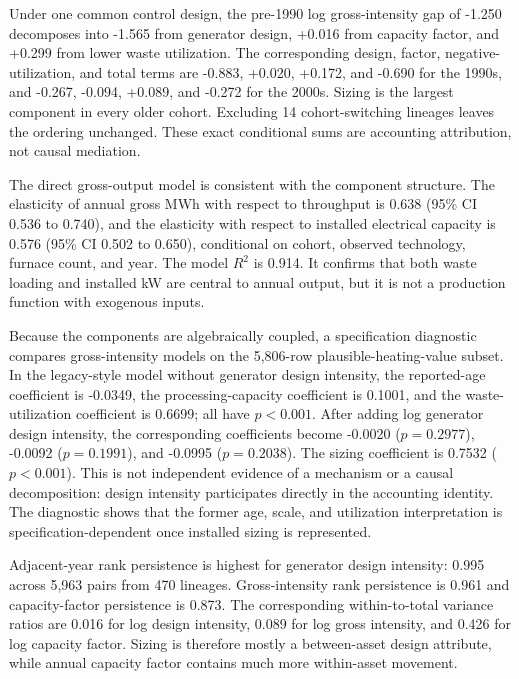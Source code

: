 \documentclass[11pt,letterpaper]{article}
\begin{document}
Under one common control design, the pre-1990 log gross-intensity gap of -1.250
decomposes into -1.565 from generator design, +0.016 from capacity factor, and
+0.299 from lower waste utilization. The corresponding design, factor,
negative-utilization, and total terms are -0.883, +0.020, +0.172, and -0.690
for the 1990s, and -0.267, -0.094, +0.089, and -0.272 for the 2000s. Sizing is
the largest component in every older cohort. Excluding 14 cohort-switching
lineages leaves the ordering unchanged. These exact conditional sums are
accounting attribution, not causal mediation.

The direct gross-output model is consistent with the component structure. The
elasticity of annual gross MWh with respect to throughput is 0.638 (95\% CI
0.536 to 0.740), and the elasticity with respect to installed electrical
capacity is 0.576 (95\% CI 0.502 to 0.650), conditional on cohort, observed
technology, furnace count, and year. The model $R^2$ is 0.914. It confirms that
both waste loading and installed kW are central to annual output, but it is not
a production function with exogenous inputs.

Because the components are algebraically coupled, a specification diagnostic
compares gross-intensity models on the 5,806-row plausible-heating-value subset.
In the legacy-style model without
generator design intensity, the reported-age coefficient is -0.0349, the
processing-capacity coefficient is 0.1001, and the waste-utilization coefficient
is 0.6699; all have $p<0.001$. After adding log generator design intensity, the
corresponding coefficients become -0.0020 ($p=0.2977$), -0.0092
($p=0.1991$), and -0.0995 ($p=0.2038$). The sizing coefficient is 0.7532
($p<0.001$). This is not independent evidence of a mechanism or a causal
decomposition: design intensity participates directly in the accounting
identity. The diagnostic shows that the former age, scale, and utilization
interpretation is specification-dependent once installed sizing is represented.

Adjacent-year rank persistence is highest for generator design intensity:
0.995 across 5,963 pairs from 470 lineages. Gross-intensity rank persistence is
0.961 and capacity-factor persistence is 0.873. The corresponding within-to-total
variance ratios are 0.016 for log design intensity, 0.089 for log gross
intensity, and 0.426 for log capacity factor. Sizing is therefore mostly a
between-asset design attribute, while annual capacity factor contains much more
within-asset movement.
\end{document}
